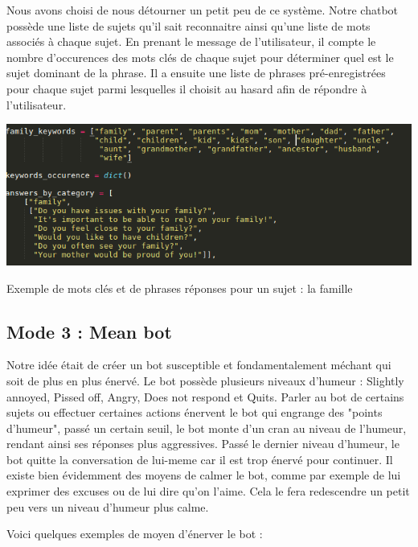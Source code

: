 \documentclass[paper=a4, fontsize=11pt]{article}
\begin{document}
Nous avons choisi de nous détourner un petit peu de ce système. Notre chatbot possède une liste de sujets qu'il sait reconnaitre ainsi qu'une liste de mots associés à chaque sujet. En prenant le message de l'utilisateur, il compte le nombre d'occurences des mots clés de chaque sujet pour déterminer quel est le sujet dominant de la phrase. Il a ensuite une liste de phrases pré-enregistrées pour chaque sujet parmi lesquelles il choisit au hasard afin de répondre à l'utilisateur. 

\begin{center}
\includegraphics[width=500pt]{MeanBot_mode2_keywords.png}
\end{center}
\begin{center}
Exemple de mots clés et de phrases réponses pour un sujet : la famille
\end{center}

\subsection{Mode 3 : Mean bot}
Notre idée était de créer un bot susceptible et fondamentalement méchant qui soit de plus en plus énervé.
Le bot possède plusieurs niveaux d'humeur : Slightly annoyed, Pissed off, Angry, Does not respond et Quits.
Parler au bot de certains sujets ou effectuer certaines actions énervent le bot qui engrange des "points d'humeur", passé un certain seuil, le bot monte d'un cran au niveau de l'humeur, rendant ainsi ses réponses plus aggressives. Passé le dernier niveau d'humeur, le bot quitte la conversation de lui-meme car il est trop énervé pour continuer.
Il existe bien évidemment des moyens de calmer le bot, comme par exemple de lui exprimer des excuses ou de lui dire qu'on l'aime. Cela le fera redescendre un petit peu vers un niveau d'humeur plus calme.


Voici quelques exemples de moyen d'énerver le bot :
\end{document}
